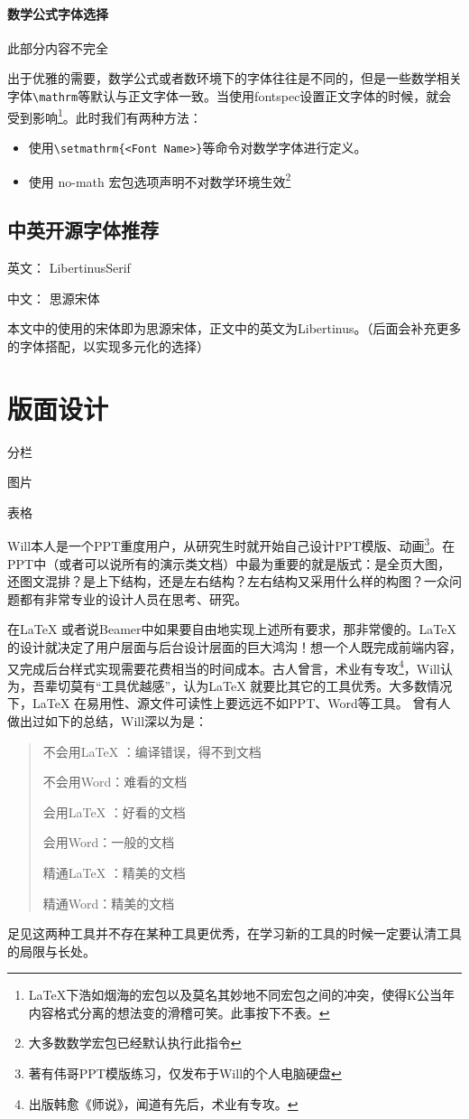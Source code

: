 \documentclass[cn,11pt,twocol,table]{elegantbook}
\begin{document}
\subsubsection{数学公式字体选择}
此部分内容不完全\par
出于优雅的需要，数学公式或者数环境下的字体往往是不同的，但是一些数学相关字体\lstinline|\mathrm|等默认与正文字体一致。当使用fontspec设置正文字体的时候，就会受到影响\footnote{\LaTeX{}下浩如烟海的宏包以及莫名其妙地不同宏包之间的冲突，使得K公当年内容格式分离的想法变的滑稽可笑。此事按下不表。}。此时我们有两种方法：
\begin{itemize}
	\item 使用\lstinline|\setmathrm{<Font Name>}|等命令对数学字体进行定义。
	\item 使用 no-math 宏包选项声明不对数学环境生效\footnote{大多数数学宏包已经默认执行此指令}
\end{itemize}
\section{中英开源字体推荐}
英文： LibertinusSerif\par
中文： 思源宋体\par
本文中的使用的宋体即为思源宋体，正文中的英文为Libertinus。（后面会补充更多的字体搭配，以实现多元化的选择）

\chapter{版面设计}
\begin{introduction}
\item 分栏
\item 图片
\item 表格
\end{introduction}
Will本人是一个PPT重度用户，从研究生时就开始自己设计PPT模版、动画\footnote{著有伟哥PPT模版练习，仅发布于Will的个人电脑硬盘}。在PPT中（或者可以说所有的演示类文档）中最为重要的就是版式：是全页大图，还图文混排？是上下结构，还是左右结构？左右结构又采用什么样的构图？一众问题都有非常专业的设计人员在思考、研究。 \par
在\LaTeX{} 或者说Beamer中如果要自由地实现上述所有要求，那非常傻的。\LaTeX{} 的设计就决定了用户层面与后台设计层面的巨大鸿沟！想一个人既完成前端内容，又完成后台样式实现需要花费相当的时间成本。古人曾言，术业有专攻\footnote{出版韩愈《师说》，闻道有先后，术业有专攻。}，Will认为，吾辈切莫有“工具优越感”，认为\LaTeX{} 就要比其它的工具优秀。大多数情况下，\LaTeX{} 在易用性、源文件可读性上要远远不如PPT、Word等工具。 曾有人做出过如下的总结，Will深以为是：
\begin{quote}
不会用\LaTeX{} ：编译错误，得不到文档\par
不会用Word：难看的文档\par
会用\LaTeX{} ：好看的文档\par
会用Word：一般的文档\par
精通\LaTeX{} ：精美的文档\par
精通Word：精美的文档
\end{quote}
足见这两种工具并不存在某种工具更优秀，在学习新的工具的时候一定要认清工具的局限与长处。
\end{document}
